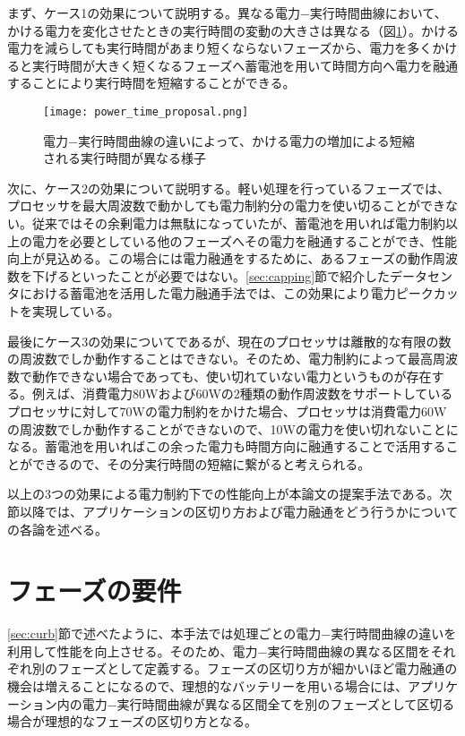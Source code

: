 まず、ケース1の効果について説明する。異なる電力−実行時間曲線において、かける電力を変化させたときの実行時間の変動の大きさは異なる（図\ref{fig:power_time_proposal}）。かける電力を減らしても実行時間があまり短くならないフェーズから、電力を多くかけると実行時間が大きく短くなるフェーズへ蓄電池を用いて時間方向へ電力を融通することにより実行時間を短縮することができる。

\begin{figure}[t]
 \begin{center}
  \texttt{[image: power\_time\_proposal.png]}
 \end{center}
 \caption{電力−実行時間曲線の違いによって、かける電力の増加による短縮される実行時間が異なる様子}
 \label{fig:power_time_proposal}
\end{figure}

次に、ケース2の効果について説明する。軽い処理を行っているフェーズでは、プロセッサを最大周波数で動かしても電力制約分の電力を使い切ることができない。従来ではその余剰電力は無駄になっていたが、蓄電池を用いれば電力制約以上の電力を必要としている他のフェーズへその電力を融通することができ、性能向上が見込める。この場合には電力融通をするために、あるフェーズの動作周波数を下げるといったことが必要ではない。\ref{sec:capping}節で紹介したデータセンタにおける蓄電池を活用した電力融通手法では、この効果により電力ピークカットを実現している。

最後にケース3の効果についてであるが、現在のプロセッサは離散的な有限の数の周波数でしか動作することはできない。そのため、電力制約によって最高周波数で動作できない場合であっても、使い切れていない電力というものが存在する。例えば、消費電力80Wおよび60Wの2種類の動作周波数をサポートしているプロセッサに対して70Wの電力制約をかけた場合、プロセッサは消費電力60Wの周波数でしか動作することができないので、10Wの電力を使い切れないことになる。蓄電池を用いればこの余った電力も時間方向に融通することで活用することができるので、その分実行時間の短縮に繋がると考えられる。

以上の3つの効果による電力制約下での性能向上が本論文の提案手法である。次節以降では、アプリケーションの区切り方および電力融通をどう行うかについての各論を述べる。


\section{フェーズの要件}
\label{sec:phase1}

\ref{sec:curb}節で述べたように、本手法では処理ごとの電力−実行時間曲線の違いを利用して性能を向上させる。そのため、電力−実行時間曲線の異なる区間をそれぞれ別のフェーズとして定義する。フェーズの区切り方が細かいほど電力融通の機会は増えることになるので、理想的なバッテリーを用いる場合には、アプリケーション内の電力−実行時間曲線が異なる区間全てを別のフェーズとして区切る場合が理想的なフェーズの区切り方となる。

